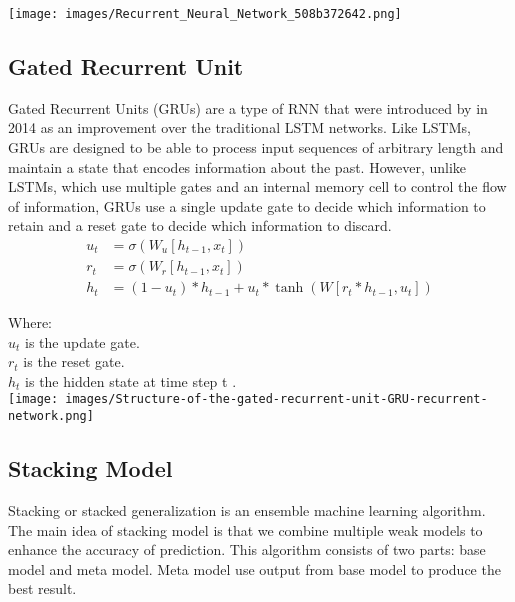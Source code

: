 \documentclass{ieeeojies}
\begin{document}
\texttt{[image: images/Recurrent\_Neural\_Network\_508b372642.png]}
\subsection{Gated Recurrent Unit}
Gated Recurrent Units (GRUs) are a type of RNN that were introduced by in 2014 as an improvement over the traditional LSTM networks. Like LSTMs, GRUs are designed to be able to process input sequences of arbitrary length and maintain a state that encodes information about the past. However, unlike LSTMs, which use multiple gates and an internal memory cell to control the flow of information, GRUs use a single update gate to decide which information to retain and a reset gate to decide which information to discard.
\begin{align*}
        u_t &= \sigma(W_u [h_{t-1}, x_t]) \\
    r_t &= \sigma(W_r [h_{t-1}, x_t]) \\
    h_t &= (1 - u_t) \ast h_{t-1} + u_t \ast \tanh(W [r_t \ast h_{t-1}, u_t])
\end{align*}


Where: \\
\indent \textbullet \(u_t\) is the update gate.\\
\indent \textbullet \(r_t\) is the reset gate.\\
\indent \textbullet \(h_t\) is the hidden state at time step t .\\
\texttt{[image: images/Structure-of-the-gated-recurrent-unit-GRU-recurrent-network.png]}
\subsection{Stacking Model}
Stacking or stacked generalization is an ensemble machine learning algorithm. The main idea of stacking model is that we combine multiple weak models to enhance the accuracy of prediction. This algorithm consists of two parts: base model and meta model. Meta model use output from base model to produce the best result.\\ \\

\end{document}
